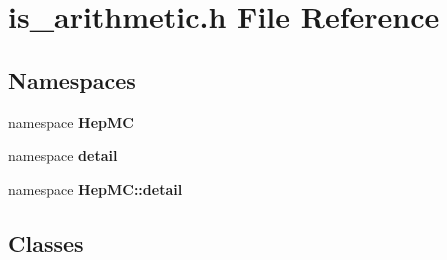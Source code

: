 \section{is\_\-arithmetic.h File Reference}
\label{is__arithmetic_8h}
\subsection*{Namespaces}
\begin{CompactItemize}
\item 
namespace {\bf Hep\-MC}
\item 
namespace {\bf detail}
\item 
namespace {\bf Hep\-MC::detail}
\end{CompactItemize}
\subsection*{Classes}
